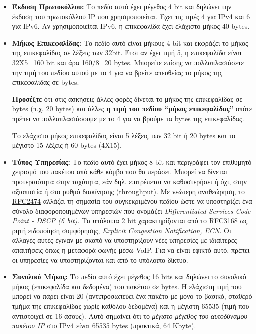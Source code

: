 \begin{itemize}
\item \textbf{Έκδοση Πρωτοκόλλου:} Το πεδίο αυτό έχει μέγεθος 4 bit και δηλώνει την έκδοση του πρωτοκόλλου IP που χρησιμοποιείται. Έχει τις τιμές 4 για IPv4 και 6 για IPv6. Αν χρησιμοποιείται IPv6, η επικεφαλίδα έχει ελάχιστο μήκος 40 bytes.
\item \textbf{Μήκος Επικεφαλίδας:} Το πεδίο αυτό είναι μήκους 4 bit και εκφράζει το μήκος της επικεφαλίδας σε λέξεις των 32bit. Έτσι αν έχει τιμή 5, η επικεφαλίδα είναι 32Χ5=160 bit και άρα 160/8=20 bytes. Μπορείτε επίσης να πολλαπλασιάσετε την τιμή του πεδίου αυτού με το 4 για να βρείτε απευθείας το μήκος της επικεφαλίδας σε bytes.

\begin{inthebox}
\textbf{Προσέξτε} ότι στις ασκήσεις άλλες φορές δίνεται το μήκος της επικεφαλίδας σε bytes (π.χ. 20 bytes) και άλλες \textbf{η τιμή του πεδίου ``μήκος επικεφαλίδας''} οπότε πρέπει να πολλαπλασιάσουμε με το 4 για να βρούμε τα bytes της επικεφαλίδας.\\
\end{inthebox}

Το ελάχιστο μήκος επικεφαλίδας είναι 5 λέξεις των 32 bit ή 20 bytes και το μέγιστο 15 λέξεις ή 60 bytes (4X15).
\item \textbf{Τύπος Υπηρεσίας:} Το πεδίο αυτό έχει μήκος 8 bit και περιγράφει τον επιθυμητό χειρισμό του πακέτου από κάθε κόμβο που θα περάσει. Μπορεί να δίνεται προτεραιότητα στην ταχύτητα, εάν δηλ. επιτρέπεται να καθυστερήσει ή όχι, στην αξιοπιστία ή στο ρυθμό διακίνησης (throughput). Με νεώτερη αναθεώρηση, το \href{https://tools.ietf.org/html/rfc2474}{RFC2474} αλλάζει τη σημασία του συγκεκριμένου πεδίου ώστε να υποστηρίζει ένα σύνολο διαφοροποιημένων υπηρεσιών που ονομάζει \emph{Differentiated Services Code Point - DSCP (6 bit)}. Τα υπόλοιπα 2 bit χαρακτηρίζονται από το \href{https://tools.ietf.org/html/rfc3168}{RFC3168}  ως ρητή ειδοποίηση συμφόρησης, \emph{Explicit Congestion Notification, ECN}. Οι αλλαγές αυτές έγιναν με σκοπό να υποστηρίξουν νέες υπηρεσίες με ιδιαίτερες απαιτήσεις όπως η μεταφορά φωνής μέσω VoIP. Για να είναι εφικτό αυτό, πρέπει οι υπηρεσίες να υποστηρίζονται και από το υπόλοιπο δίκτυο. 

\item \textbf{Συνολικό Μήκος:} Το πεδίο αυτό έχει μέγεθος 16 bits και δηλώνει το συνολικό μήκος (επικεφαλίδα και δεδομένα) του πακέτου σε bytes. Η ελάχιστη τιμή που μπορεί να πάρει είναι 20 (αντιπροσωπεύει ένα πακέτο με μόνο το βασικό, σταθερό τμήμα της επικεφαλίδας χωρίς καθόλου δεδομένα) και η μέγιστη 65535 (τιμή που αντιστοιχεί σε 16 άσους). Αυτό σημαίνει ότι το \emph{μέγιστο μέγεθος του αυτοδύναμου πακέτου IP} στο IPv4 είναι 65535 bytes (πρακτικά, 64 Kbyte).


\end{itemize}
